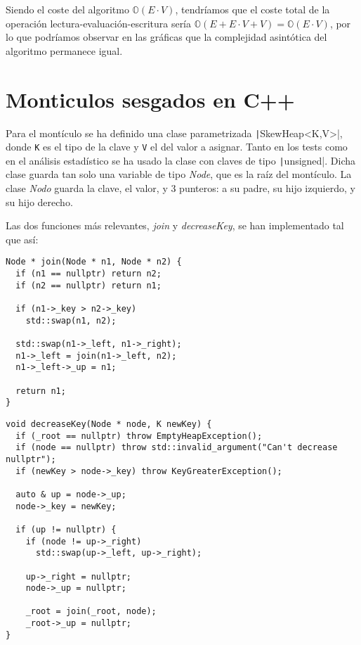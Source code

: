 \documentclass{article}
\begin{document}
Siendo el coste del algoritmo $\mathbb{O}\left(E\cdot V\right)$, tendríamos que el coste total de la operación lectura-evaluación-escritura sería $\mathbb{O}\left(E + E\cdot V + V\right)=\mathbb{O}\left(E\cdot V\right)$, por lo que podríamos observar en las gráficas que la complejidad asintótica del algoritmo permanece igual.

\section{Monticulos sesgados en C++}
Para el montículo se ha definido una clase parametrizada \texttt|SkewHeap<K,V>|, donde \texttt{K} es el tipo de la clave y \texttt{V} el del valor a asignar. Tanto en los tests como en el análisis estadístico se ha usado la clase con claves de tipo \texttt|unsigned|. Dicha clase guarda tan solo una variable de tipo \textit{Node}, que es la raíz del montículo. La clase \textit{Nodo} guarda la clave, el valor, y 3 punteros: a su padre, su hijo izquierdo, y su hijo derecho.

Las dos funciones más relevantes, \textit{join} y \textit{decreaseKey}, se han implementado tal que así:

\begin{verbatim}
Node * join(Node * n1, Node * n2) {
  if (n1 == nullptr) return n2;
  if (n2 == nullptr) return n1;

  if (n1->_key > n2->_key)
	std::swap(n1, n2);

  std::swap(n1->_left, n1->_right);
  n1->_left = join(n1->_left, n2);
  n1->_left->_up = n1;

  return n1;
}
\end{verbatim}
\begin{verbatim}
void decreaseKey(Node * node, K newKey) {
  if (_root == nullptr) throw EmptyHeapException();
  if (node == nullptr) throw std::invalid_argument("Can't decrease nullptr");
  if (newKey > node->_key) throw KeyGreaterException();

  auto & up = node->_up;
  node->_key = newKey;

  if (up != nullptr) {
	if (node != up->_right)
	  std::swap(up->_left, up->_right);

	up->_right = nullptr;
	node->_up = nullptr;

	_root = join(_root, node);
	_root->_up = nullptr;
}
\end{verbatim}
\end{document}
